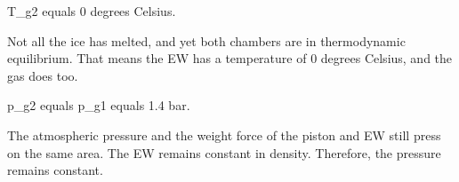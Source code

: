T_g2 equals 0 degrees Celsius.  

Not all the ice has melted, and yet both chambers are in thermodynamic equilibrium. That means the EW has a temperature of 0 degrees Celsius, and the gas does too.  

p_g2 equals p_g1 equals 1.4 bar.  

The atmospheric pressure and the weight force of the piston and EW still press on the same area. The EW remains constant in density. Therefore, the pressure remains constant.